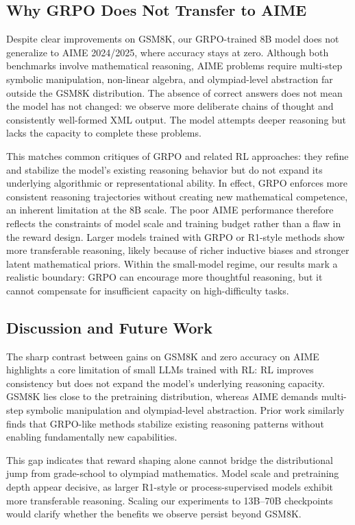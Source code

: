 \documentclass{article}
\begin{document}
\subsection{Why GRPO Does Not Transfer to AIME}

Despite clear improvements on GSM8K, our GRPO-trained 8B model does not generalize to AIME 2024/2025, where accuracy stays at zero. Although both benchmarks involve mathematical reasoning, AIME problems require multi-step symbolic manipulation, non-linear algebra, and olympiad-level abstraction far outside the GSM8K distribution. The absence of correct answers does not mean the model has not changed: we observe more deliberate chains of thought and consistently well-formed XML output. The model attempts deeper reasoning but lacks the capacity to complete these problems.

This matches common critiques of GRPO and related RL approaches: they refine and stabilize the model's existing reasoning behavior but do not expand its underlying algorithmic or representational ability. In effect, GRPO enforces more consistent reasoning trajectories without creating new mathematical competence, an inherent limitation at the 8B scale. The poor AIME performance therefore reflects the constraints of model scale and training budget rather than a flaw in the reward design. Larger models trained with GRPO or R1-style methods show more transferable reasoning, likely because of richer inductive biases and stronger latent mathematical priors. Within the small-model regime, our results mark a realistic boundary: GRPO can encourage more thoughtful reasoning, but it cannot compensate for insufficient capacity on high-difficulty tasks.

\subsection{Discussion and Future Work}

The sharp contrast between gains on GSM8K and zero accuracy on AIME highlights a core limitation of small LLMs trained with RL: RL improves consistency but does not expand the model's underlying reasoning capacity. GSM8K lies close to the pretraining distribution, whereas AIME demands multi-step symbolic manipulation and olympiad-level abstraction. Prior work \cite{r1zero2025, deepseekr1, simplerlzoo} similarly finds that GRPO-like methods stabilize existing reasoning patterns without enabling fundamentally new capabilities.

This gap indicates that reward shaping alone cannot bridge the distributional jump from grade-school to olympiad mathematics. Model scale and pretraining depth appear decisive, as larger R1-style or process-supervised models \cite{deepseekr1, wang2025rlsurvey} exhibit more transferable reasoning. Scaling our experiments to 13B--70B checkpoints would clarify whether the benefits we observe persist beyond GSM8K.
\end{document}
